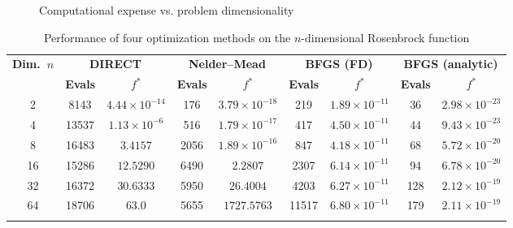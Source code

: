 \documentclass{article}
\begin{document}
\begin{figure}[H]
\centering
    \centering
    
    \caption{Computational expense vs. problem dimensionality}
    \label{fig:6_3_fcalls}
\end{figure}

\begin{table}[h!]
\centering
\caption{Performance of four optimization methods on the $n$-dimensional Rosenbrock function}
\label{tab:rosenbrock_results}
\renewcommand{\arraystretch}{1.3}

\begin{tabular}{c|cc|cc|cc|cc}
\hline
\textbf{Dim.\ $n$} 
& \multicolumn{2}{c|}{\textbf{DIRECT}} 
& \multicolumn{2}{c|}{\textbf{Nelder--Mead}} 
& \multicolumn{2}{c|}{\textbf{BFGS (FD)}} 
& \multicolumn{2}{c}{\textbf{BFGS (analytic)}} \\
\cline{2-9}
& \textbf{Evals} & $f^*$ 
& \textbf{Evals} & $f^*$
& \textbf{Evals} & $f^*$
& \textbf{Evals} & $f^*$ \\
\hline

2  & 8143  & $4.44\times10^{-14}$
   & 176   & $3.79\times10^{-18}$
   & 219   & $1.89\times10^{-11}$
   & 36    & $2.98\times10^{-23}$ \\

4  & 13537 & $1.13\times10^{-6}$
   & 516   & $1.79\times10^{-17}$
   & 417   & $4.50\times10^{-11}$
   & 44    & $9.43\times10^{-23}$ \\

8  & 16483 & $3.4157$
   & 2056  & $1.89\times10^{-16}$
   & 847   & $4.18\times10^{-11}$
   & 68    & $5.72\times10^{-20}$ \\

16 & 15286 & $12.5290$
   & 6490  & $2.2807$
   & 2307  & $6.14\times10^{-11}$
   & 94    & $6.78\times10^{-20}$ \\

32 & 16372 & $30.6333$
   & 5950  & $26.4004$
   & 4203  & $6.27\times10^{-11}$
   & 128   & $2.12\times10^{-19}$ \\

64 & 18706 & $63.0$
   & 5655  & $1727.5763$
   & 11517 & $6.80\times10^{-11}$
   & 179   & $2.11\times10^{-19}$ \\

\hline
\label{tab:fvn}
\end{tabular}
\end{table}
\end{document}
